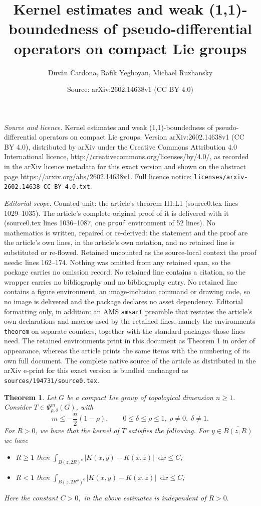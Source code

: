 \documentclass[10pt,a4paper]{amsart}
\title{Kernel estimates and weak (1,1)-boundedness of pseudo-differential operators on compact Lie groups}
\author{Duv\'an Cardona, Rafik Yeghoyan, Michael Ruzhansky}
\date{Source: arXiv:2602.14638v1 (CC BY 4.0)}
\newtheorem{theorem}{Theorem}
\newcommand*\diff{\mathop{}\!\mathrm{d}}
\begin{document}
\maketitle

\noindent\emph{Source and licence.} Kernel estimates and weak (1,1)-boundedness of pseudo-differential operators on compact Lie groups. Version arXiv:2602.14638v1 (CC BY 4.0), distributed by arXiv under the Creative Commons Attribution 4.0 International licence, http://creativecommons.org/licenses/by/4.0/, as recorded in the arXiv licence metadata for this exact version and shown on the abstract page https://arxiv.org/abs/2602.14638v1. Full licence notice: \texttt{licenses/arxiv-2602.14638-CC-BY-4.0.txt}.\par\smallskip

\noindent\textit{Editorial scope.} Counted unit: the article's theorem H1:L1 (source0.tex lines 1029--1035). The article's complete original proof of it is delivered with it (source0.tex lines 1036--1087, one \texttt{proof} environment of 52 lines). No mathematics is written, repaired or re-derived: the statement and the proof are the article's own lines, in the article's own notation, and no retained line is substituted or re-flowed.  Retained uncounted as the source-local context the proof needs: lines 162--174.  Nothing was omitted from any retained span, so the package carries no omission record.  No retained line contains a citation, so the wrapper carries no bibliography and no bibliography entry.  No retained line contains a figure environment, an image-inclusion command or drawing code, so no image is delivered and the package declares no asset dependency.  Editorial formatting only, in addition: an AMS \texttt{amsart} preamble that restates the article's own declarations and macros used by the retained lines, namely the environments \texttt{theorem} on separate counters, together with the standard packages those lines need.  The retained environments print in this document as Theorem 1 in order of appearance, whereas the article prints the same items with the numbering of its own full document.  The complete native source of the article as distributed in the arXiv e-print for this exact version is bundled unchanged as \texttt{sources/194731/source0.tex}.
 \begin{theorem}\label{kernel_estimates}
    Let $G$ be a compact Lie group of topological dimension $n\geq 1$. Consider $T\in\Psi^{m}_{\rho,\delta}(G)$, with \[
m \le -\frac{n}{2}(1-\rho),
\qquad 0 \le \delta \le \rho \le 1,\ \rho\neq0,\;\delta \neq 1.
\]
For $R>0$, we have that the kernel of $T$ satisfies the following. For $y\in\overline{B(z, R)}$ we have
    \begin{itemize}
        \item $R\geq 1$ then
        $\int_{B(z, 2R)^c}|K(x,y)-K(x,z)|\diff{x}\leq C$;
         \item $R<1$ then $\int_{B(z, 2R^{\rho})^c}|K(x,y)-K(x,z)|\diff{x}\leq C$;
    \end{itemize}
    Here the constant $C>0,$ in the above estimates is independent of $R>0.$
\end{theorem}
\end{document}
